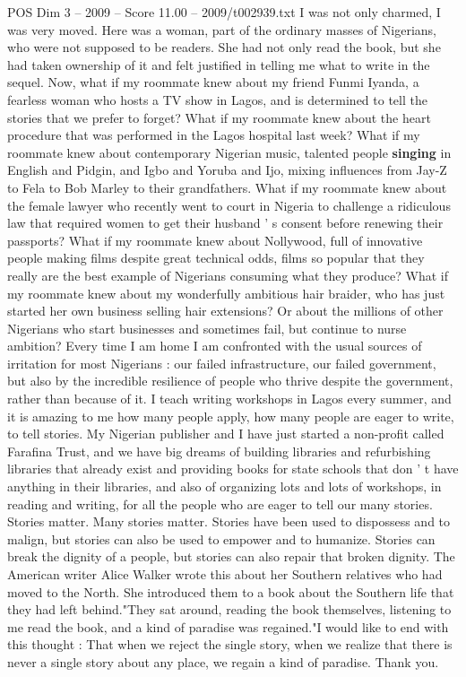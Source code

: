 \begin{textsample}{POS Dim 3 – 2009 – Score 11.00 – 2009/t002939.txt}
I was not only charmed, I was very moved.
Here was a woman, part of the ordinary masses of Nigerians, who were not supposed to be readers.
She had not only read the book, but she had taken ownership of it and felt justified in telling me what to write in the sequel.
Now, what if my roommate knew about my friend Funmi Iyanda, a fearless woman who hosts a TV show in Lagos, and is determined to tell the stories that we prefer to forget?
What if my roommate knew about the heart procedure that was performed in the Lagos hospital last week?
What if my roommate knew about contemporary Nigerian music, talented people \textbf{singing} in English and Pidgin, and Igbo and Yoruba and Ijo, mixing influences from Jay-Z to Fela to Bob Marley to their grandfathers.
What if my roommate knew about the female lawyer who recently went to court in Nigeria to challenge a ridiculous law that required women to get their husband ' s consent before renewing their passports?
What if my roommate knew about Nollywood, full of innovative people making films despite great technical odds, films so popular that they really are the best example of Nigerians consuming what they produce?
What if my roommate knew about my wonderfully ambitious hair braider, who has just started her own business selling hair extensions?
Or about the millions of other Nigerians who start businesses and sometimes fail, but continue to nurse ambition?
Every time I am home I am confronted with the usual sources of irritation for most Nigerians : our failed infrastructure, our failed government, but also by the incredible resilience of people who thrive despite the government, rather than because of it.
I teach writing workshops in Lagos every summer, and it is amazing to me how many people apply, how many people are eager to write, to tell stories.
My Nigerian publisher and I have just started a non-profit called Farafina Trust, and we have big dreams of building libraries and refurbishing libraries that already exist and providing books for state schools that don ' t have anything in their libraries, and also of organizing lots and lots of workshops, in reading and writing, for all the people who are eager to tell our many stories.
Stories matter.
Many stories matter.
Stories have been used to dispossess and to malign, but stories can also be used to empower and to humanize.
Stories can break the dignity of a people, but stories can also repair that broken dignity.
The American writer Alice Walker wrote this about her Southern relatives who had moved to the North.
She introduced them to a book about the Southern life that they had left behind."They sat around, reading the book themselves, listening to me read the book, and a kind of paradise was regained."I would like to end with this thought : That when we reject the single story, when we realize that there is never a single story about any place, we regain a kind of paradise.
Thank you.

\end{textsample}
